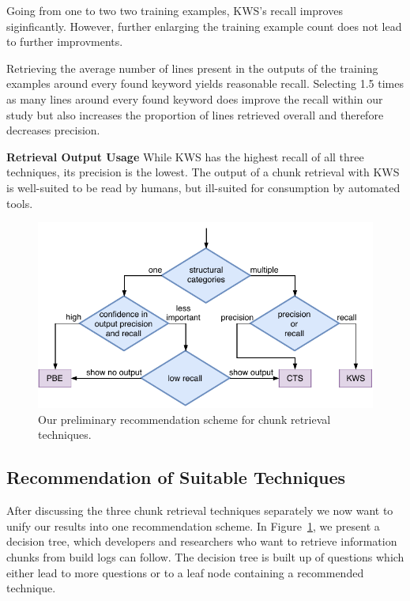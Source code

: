 Going from one to two two training examples, KWS's recall improves
siginficantly. However, further enlarging the training example count
does not lead to further improvments.

Retrieving the average number of lines present in the outputs of the
training examples around every found keyword yields reasonable recall.
Selecting 1.5 times as many lines around every found keyword does
improve the recall within our study but also increases the proportion
of lines retrieved overall and therefore decreases precision.

\noindent
\textbf{Retrieval Output Usage}
While KWS has the highest recall of all three techniques, its
precision is the lowest. The output of a chunk retrieval with KWS is
well-suited to be read by humans, but ill-suited for consumption by
automated tools.

\begin{figure}[tb]
		\centering
		\includegraphics[width=\columnwidth, clip]{img/crt-recommendation.pdf}
		\caption{Our preliminary recommendation scheme for chunk retrieval techniques.}
		\label{fig:crt-recommendation}
\end{figure}

\subsection{Recommendation of Suitable Techniques}
After discussing the three chunk retrieval techniques separately we
now want to unify our results into one recommendation scheme. In
Figure~\ref{fig:crt-recommendation}, we present a decision tree, which
developers and researchers who want to retrieve information chunks
from build logs can follow. The decision tree is built up of questions
which either lead to more questions or to a leaf node containing a
recommended technique. 

